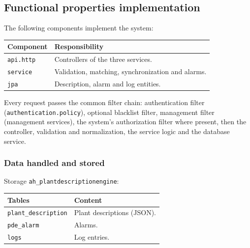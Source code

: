 \documentclass[a4paper]{arrowhead}
\begin{document}
\subsection{Functional properties implementation}

The following components implement the system:

\noindent\begin{longtable}{| p{5.6cm} | p{9.6cm} |} \hline
\rowcolor{gray!33} Component & Responsibility \\ \hline \endhead
\texttt{api.\allowbreak{}http} & Controllers of the three services. \\ \hline
\texttt{service} & Validation, matching, synchronization and alarms. \\ \hline
\texttt{jpa} & Description, alarm and log entities. \\ \hline
\end{longtable}

Every request passes the common filter chain: authentication filter (\texttt{authentication.\allowbreak{}policy}), optional blacklist filter, management filter (management services), the system's authorization filter where present, then the controller, validation and normalization, the service logic and the database service.

\subsubsection{Data handled and stored}

Storage \texttt{ah\_\allowbreak{}plantdescriptionengine}:

\noindent\begin{longtable}{| p{6.4cm} | p{8.8cm} |} \hline
\rowcolor{gray!33} Tables & Content \\ \hline \endhead
\texttt{plant\_\allowbreak{}description} & Plant descriptions (JSON). \\ \hline
\texttt{pde\_\allowbreak{}alarm} & Alarms. \\ \hline
\texttt{logs} & Log entries. \\ \hline
\end{longtable}
\end{document}
